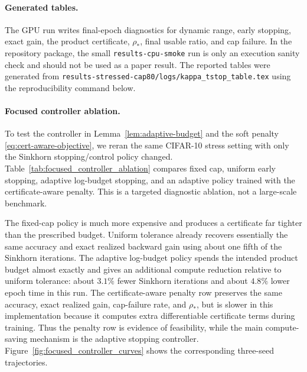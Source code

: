\documentclass[11pt]{article}
\numberwithin{equation}{section}
\theoremstyle{plain}
\theoremstyle{definition}
\theoremstyle{remark}
\begin{document}
\paragraph{Generated tables.}
The GPU run writes final-epoch diagnostics for dynamic range, early stopping, exact gain,
the product certificate, \(\rho_*\), final usable ratio, and cap failure. In the
repository package, the small \texttt{results-cpu-smoke} run is only an execution sanity check and
should not be used as a paper result. The reported tables were generated from
\texttt{results-stressed-cap80/logs/kappa\_tstop\_table.tex} using the reproducibility
command below.

\paragraph{Focused controller ablation.}
To test the controller in Lemma~\ref{lem:adaptive-budget} and the soft penalty
\eqref{eq:cert-aware-objective}, we reran the same CIFAR-10 stress setting with only the
Sinkhorn stopping/control policy changed. Table~\ref{tab:focused_controller_ablation}
compares fixed cap, uniform early stopping, adaptive log-budget stopping, and an
adaptive policy trained with the certificate-aware penalty. This is a targeted diagnostic
ablation, not a large-scale benchmark.

The fixed-cap policy is much more expensive and produces a certificate far tighter than
the prescribed budget. Uniform tolerance already recovers essentially the same accuracy
and exact realized backward gain using about one fifth of the Sinkhorn iterations. The
adaptive log-budget policy spends the intended product budget almost exactly and gives an
additional compute reduction relative to uniform tolerance: about \(3.1\%\) fewer Sinkhorn
iterations and about \(4.8\%\) lower epoch time in this run. The certificate-aware penalty
row preserves the same accuracy, exact realized gain, cap-failure rate, and \(\rho_*\),
but is slower in this implementation because it computes extra differentiable certificate
terms during training. Thus the penalty row is evidence of feasibility, while the main
compute-saving mechanism is the adaptive stopping controller. Figure~\ref{fig:focused_controller_curves}
shows the corresponding three-seed trajectories.
\end{document}
